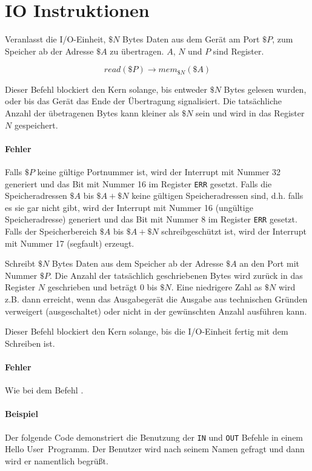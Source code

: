 \section{IO Instruktionen}
\label{sec:IO-Instruktionen}




Veranlasst die I/O-Einheit, $\$N$ Bytes Daten aus dem Gerät am Port $\$P$, zum
Speicher ab der Adresse $\$A$ zu übertragen. $A$, $N$ und $P$ sind Register.

\[
  read(\$P) \to mem_{\$N}(\$A)
\]

Dieser Befehl blockiert den Kern solange, bis entweder $\$N$ Bytes gelesen
wurden, oder bis das Gerät das Ende der Übertragung signalisiert. Die
tatsächliche Anzahl der übetragenen Bytes kann kleiner als $\$N$ sein und wird
in das Register $N$ gespeichert.


\paragraph{Fehler}
Falls $\$P$ keine gültige Portnummer ist, wird der Interrupt mit Nummer 32
generiert und das Bit mit Nummer 16 im Register \texttt{ERR} gesetzt.
Falls die Speicheradressen $\$A$ bis $\$A + \$N$ keine gültigen Speicheradressen
sind, d.h. falls es sie gar nicht gibt, wird der Interrupt mit Nummer 16
(ungültige Speicheradresse) generiert und das Bit mit Nummer 8 im Register
\texttt{ERR} gesetzt. Falls der Speicherbereich $\$A$ bis $\$A + \$N$
schreibgeschützt ist, wird der Interrupt mit Nummer 17 (segfault) erzeugt.


Schreibt $\$N$ Bytes Daten aus dem Speicher ab der Adresse $\$A$ an den Port mit
Nummer $\$P$. Die Anzahl der tatsächlich geschriebenen Bytes wird zurück in das
Register $N$ geschrieben und beträgt $0$ bis $\$N$. Eine niedrigere Zahl
as $\$N$ wird z.B. dann erreicht, wenn das Ausgabegerät die Ausgabe aus
technischen Gründen verweigert (ausgeschaltet) oder nicht in der gewünschten
Anzahl ausführen kann.

Dieser Befehl blockiert den Kern solange, bis die I/O-Einheit fertig mit dem
Schreiben ist.

\paragraph{Fehler}
Wie bei dem Befehl .


\paragraph{Beispiel}
Der folgende Code demonstriert die Benutzung der \texttt{IN} und \texttt{OUT}
Befehle in einem \glqq Hello User\grqq\ Programm. Der Benutzer wird nach seinem
Namen gefragt und dann wird er namentlich begrüßt.

